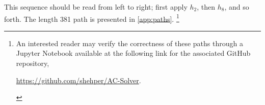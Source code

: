 This sequence should be read from left to right; first apply $h_2$, then $h_8$, and so forth. The length 381 path is presented in \cref{app:paths}. 
\footnote{An interested reader may verify the correctness of these paths through a Jupyter Notebook available at the following link for the associated GitHub repository,
\begin{center}
\href{https://github.com/shehper/AC-Solver}{https://github.com/shehper/AC-Solver}.
\end{center}
}
